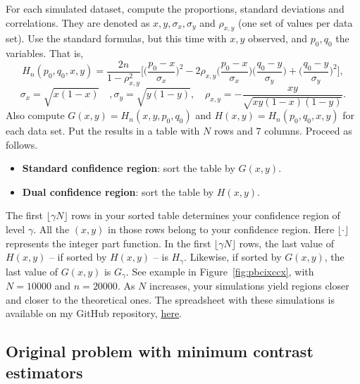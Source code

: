 \documentclass[oneside,10pt]{book}
\begin{document}
For each simulated dataset, compute the proportions, standard deviations and correlations. They are denoted as 
$x , y, \sigma_x, \sigma_y$ and $\rho_{x,y}$ (one set of values per data set). Use the standard formulas, but this time with $x,y$ observed, and $p_0,q_0$ the variables. That is, 
$$
H_n(p_0,q_0,x,y)=\frac{2n}{1-\rho_{x,y}^2}
\Big[\Big( \frac{p_0-x}{\sigma_x}\Big)^2 
-2\rho_{x,y}\Big(\frac{p_0-x}{\sigma_x}\Big)\Big(\frac{q_0-y}{\sigma_y}\Big) 
+ \Big(\frac{q_0-y}{\sigma_y}\Big)^2\Big],
$$
$$\sigma_x = \sqrt{x(1-x)}\quad, \sigma_y = \sqrt{y(1-y)},\quad \rho_{x,y}=-\frac{xy}{\sqrt{xy(1-x)(1-y)}}.$$ 
Also compute $G(x, y) = H_n(x, y, p_0, q_0)$ and $H(x, y) = H_n(p_0, q_0, x, y)$ for each data set. Put the results in a table with $N$ rows and $7$ columns. Proceed as follows. \vspace{1ex}

\begin{itemize}
\item {\bf Standard confidence region}: sort the table by $G(x, y)$.
\item {\bf Dual confidence region}: sort the table by $H(x, y)$.
\end{itemize}\vspace{1ex}

\noindent The first $\lfloor\gamma N\rfloor$ rows in your sorted table determines your confidence region of level $\gamma$. All the $(x, y)$ in those rows belong to your confidence region. Here $\lfloor\cdot\rfloor$ represents the integer part function. In the first $\lfloor\gamma N\rfloor$ rows, the last value of $H(x, y)$ -- if sorted by $H(x, y)$ -- is $H_\gamma$. Likewise, if sorted by $G(x, y)$, the last value of $G(x, y)$ is $G_\gamma$. See example in Figure~\ref{fig:pbcixccx}, with 
$N = \num{10000}$ and $n = \num{20000}$. As $N$ increases, your simulations yield regions closer and closer to the theoretical ones. The spreadsheet with these simulations is available on my GitHub repository, \href{https://github.com/VincentGranville/Point-Processes/tree/main/Spreadsheets}{here}.

\subsection{Original problem with minimum contrast estimators}\label{orfucv}
\end{document}
